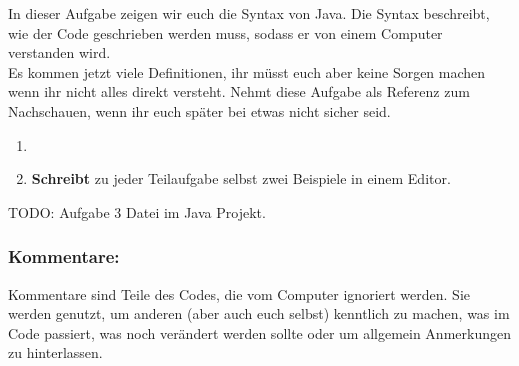 
\noindent
In dieser Aufgabe zeigen wir euch die Syntax von Java.
Die Syntax beschreibt, wie der Code geschrieben werden muss, sodass er von einem Computer verstanden wird.\\
Es kommen jetzt viele Definitionen, ihr müsst euch aber keine Sorgen machen wenn ihr nicht alles direkt versteht.
Nehmt diese Aufgabe als Referenz zum Nachschauen, wenn ihr euch später bei etwas nicht sicher seid.
\begin{enumerate}
	\item {}
	\item \textbf{Schreibt} zu jeder Teilaufgabe selbst zwei Beispiele in einem Editor. 
\end{enumerate}


{\color{red}TODO: Aufgabe 3 Datei im Java Projekt.}

\begin{Infobox}
	
	\subsubsection*{Kommentare:}
	Kommentare sind Teile des Codes, die vom Computer ignoriert werden.
	Sie werden genutzt, um anderen (aber auch euch selbst) kenntlich zu machen, was im Code passiert, was noch verändert werden sollte oder um allgemein Anmerkungen zu hinterlassen.
\end{Infobox}


